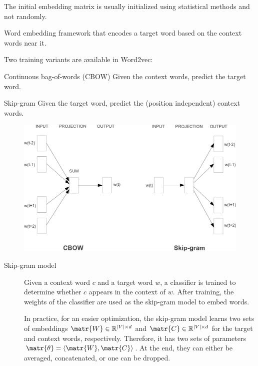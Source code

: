 \begin{description}
\begin{description}
                \begin{remark}
                    The initial embedding matrix is usually initialized using statistical methods and not randomly.
                \end{remark}
        \end{description}

    \item[Word2vec] 
        Word embedding framework that encodes a target word based on the context words near it.

        Two training variants are available in Word2vec:
        \begin{descriptionlist}
            \item[Continuous bag-of-words (CBOW)]
                Given the context words, predict the target word.

            \item[Skip-gram]
                Given the target word, predict the (position independent) context words.
        \end{descriptionlist}

        \begin{figure}[H]
            \centering
            \includegraphics[width=0.5\linewidth]{./img/word2vec_alternatives.png}
        \end{figure}

        \begin{description}
            \item[Skip-gram model] 
                Given a context word $c$ and a target word $w$, a classifier is trained to determine whether $c$ appears in the context of $w$. After training, the weights of the classifier are used as the skip-gram model to embed words.

                \begin{remark}
                    In practice, for an easier optimization, the skip-gram model learns two sets of embeddings $\matr{W} \in \mathbb{R}^{|V| \times d}$ and $\matr{C} \in \mathbb{R}^{|V| \times d}$ for the target and context words, respectively. Therefore, it has two sets of parameters $\matr{\theta} = \langle\matr{W}, \matr{C}\rangle$. At the end, they can either be averaged, concatenated, or one can be dropped.
                \end{remark}


\end{description}
\end{description}
